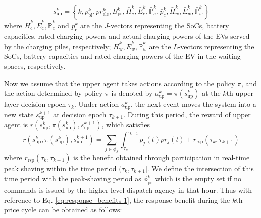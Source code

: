 \documentclass[preprint,12pt]{elsarticle}
\begin{document}
\begin{equation}
s_{\textrm{up}}^{k}=\left\{ k,p_{\textrm{bl}}^{k},pr_{\textrm{ele}}^{k},B_{\textrm{ps}}^{k},\bar{H}_{c}^{k},\bar{E}_{c}^{k},\bar{\mathbb{P}}_{c}^{k},\bar{p}_{c}^{k},\bar{H}_{w}^{k},\bar{E}_{w}^{k},\bar{\mathbb{P}}_{w}^{k}\right\} \label{eq:up_decision_state}
\end{equation}
where $\bar{H}_{\textrm{c}}^{k},\bar{E}_{\textrm{c}}^{k},\bar{\mathbb{P}}_{c}^{k}$ and $\bar{p}_{\textrm{c}}^{k}$ are the $J$-vectors representing the SoCs, battery capacities, rated charging powers and actual charging powers of the EVs served by the charging piles, respectively; $\bar{H}_{\textrm{w}}^{k},\bar{E}_{w}^{k},\bar{\mathbb{P}}_{w}^{k}$ are the $L$-vectors representing the SoCs, battery capacities and rated charging powers of the EV in the waiting spaces, respectively.

Now we assume that the upper agent takes actions according to the policy $\pi$, and the action determined by policy $\pi$ is denoted by $a_{\textrm{up}}^{k}=\pi(s_{\textrm{up}}^{k})$ at the $k$th upper-layer decision epoch $\tau_{k}$. Under action $a_{\textrm{up}}^{k}$, the
next event moves the system into a new state $s_{\textrm{up}}^{k+1}$ at decision epoch $\tau_{k+1}$. During this period, the reward of
upper agent is $r(s_{\textrm{up}}^{k},\pi(s_{\textrm{up}}^{k}),s_{\textrm{up}}^{k+1})$, which satisfies
\begin{equation}
r(s_{\textrm{up}}^{k},\pi(s_{\textrm{up}}^{k}),s_{\textrm{up}}^{k+1})=\underset{j\in\phi_{J}}{\sum}\int_{\tau_{k}}^{\tau_{k+1}}p_{j}\left(t\right)pr_{j}(t)+r_{\textrm{rsp}}(\tau_{k},\tau_{k+1})
\label{eq:transit_reaward_upper}
\end{equation}
where $r_{\textrm{rsp}}(\tau_{k},\tau_{k+1})$ is the benefit obtained through participation in real-time peak shaving within the time period $(\tau_{k},\tau_{k+1}]$. We define the intersection of this time period with the peak-shaving period as $\phi_{\textrm{ps}}^{k}$ which
is the empty set if no commands is issued by the higher-level dispatch agency in that hour. Thus with reference to Eq. \ref{eq:response_benefits-1}, the response benefit during the $k$th price cycle can be obtained
as follows:
\end{document}
